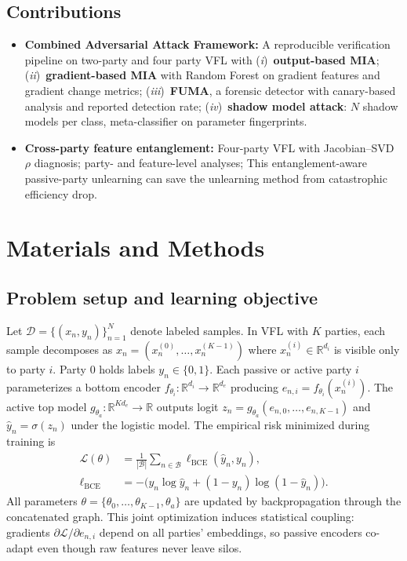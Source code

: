 \documentclass[sigconf,nonacm]{acmart}
\begin{document}
\subsection{Contributions}
\begin{itemize}[leftmargin=*]
  \item \textbf{Combined Adversarial Attack Framework:} A reproducible verification pipeline on two-party and four party VFL with (\textit{i})~\textbf{output-based MIA}; (\textit{ii})~\textbf{gradient-based MIA} with Random Forest on gradient features and gradient change metrics; (\textit{iii})~\textbf{FUMA}, a forensic detector with canary-based analysis and reported detection rate; (\textit{iv})~\textbf{shadow model attack}: $N$ shadow models per class, meta-classifier on parameter fingerprints.
  
  \item \textbf{Cross-party feature entanglement:} Four-party VFL with Jacobian--SVD $\rho$ diagnosis; party- and feature-level analyses; This entanglement-aware passive-party unlearning can save the unlearning method from catastrophic efficiency drop.

\end{itemize}

\section{Materials and Methods}
\label{sec:methods}

\subsection{Problem setup and learning objective}
Let $\mathcal{D}=\{(x_n,y_n)\}_{n=1}^N$ denote labeled samples. In VFL with $K$ parties, each sample decomposes as $x_n=(x_n^{(0)},\ldots,x_n^{(K-1)})$ where $x_n^{(i)}\in\mathbb{R}^{d_i}$ is visible only to party $i$. Party $0$ holds labels $y_n\in\{0,1\}$. Each passive or active party $i$ parameterizes a bottom encoder $f_{\theta_i}:\mathbb{R}^{d_i}\to\mathbb{R}^{d_e}$ producing $e_{n,i}=f_{\theta_i}(x_n^{(i)})$. The active top model $g_{\theta_a}:\mathbb{R}^{K d_e}\to\mathbb{R}$ outputs logit $z_n = g_{\theta_a}(e_{n,0},\ldots,e_{n,K-1})$ and $\hat{y}_n=\sigma(z_n)$ under the logistic model. The empirical risk minimized during training is
\begin{equation}
\begin{aligned}
\mathcal{L}(\theta)
&= \frac{1}{|\mathcal{B}|}\sum_{n\in\mathcal{B}} 
   \ell_{\mathrm{BCE}}(\hat{y}_n,y_n), \\
\ell_{\mathrm{BCE}}
&= -\bigl( y_n \log \hat{y}_n 
   + (1-y_n)\log(1-\hat{y}_n)\bigr).
\end{aligned}
\end{equation}
All parameters $\theta=\{\theta_0,\ldots,\theta_{K-1},\theta_a\}$ are updated by backpropagation through the concatenated graph. This joint optimization induces statistical coupling: gradients $\partial \mathcal{L}/\partial e_{n,i}$ depend on all parties' embeddings, so passive encoders co-adapt even though raw features never leave silos.
\end{document}
